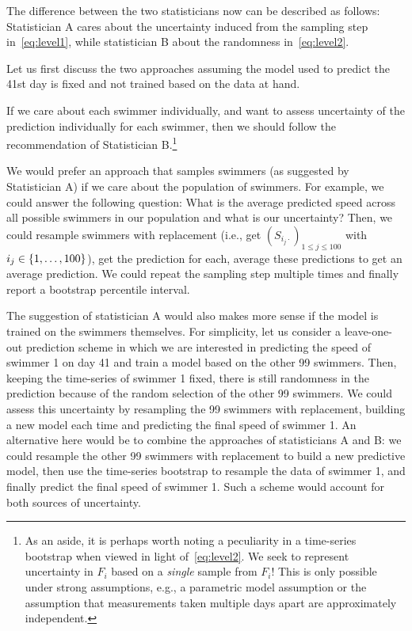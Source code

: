 The difference between the two statisticians now can be described as follows: Statistician A  cares about the uncertainty induced from the sampling step in~\eqref{eq:level1}, while statistician B about the randomness in~\eqref{eq:level2}. 

Let us first discuss the two approaches assuming the model used to predict the 41st day is fixed and not trained based on the data at hand.

If we care about each swimmer individually, and want to assess uncertainty of the prediction individually for each swimmer, then we should follow the recommendation of Statistician B.\footnote{As an aside, it is perhaps worth noting a peculiarity in a time-series bootstrap when viewed in light of~\eqref{eq:level2}. We seek to represent uncertainty in $F_i$ based on a \emph{single} sample from $F_i$! This is only possible under strong assumptions, e.g., a parametric model assumption or the assumption that measurements taken multiple days apart are approximately independent.}

We would prefer an approach that samples swimmers (as suggested by Statistician A) if we care about the population of swimmers. For example, we could answer the following question: What is the average predicted speed across all possible swimmers in our population and what is our uncertainty? Then, we could resample swimmers with replacement (i.e., get $(S_{i_j\cdot})_{1\leq j \leq 100}$ with $i_j \in \left\{1,\dotsc,100\right\}$), get the prediction for each, average these predictions to get an average prediction. We could repeat the sampling step multiple times and finally report a bootstrap percentile interval.

The suggestion of statistician A would also makes more sense if the model is trained on the swimmers themselves. For simplicity, let us consider a leave-one-out prediction scheme in which we are interested in predicting the speed of swimmer 1 on day 41 and train a model based on the other 99 swimmers. Then, keeping the time-series of swimmer 1 fixed, there is still randomness in the prediction because of the random selection of the other 99 swimmers. We could assess this uncertainty by resampling the 99 swimmers with replacement, building a new model each time and predicting the final speed of swimmer 1. An alternative here would be to combine the approaches of statisticians A and B: we could resample the other 99 swimmers with replacement to build a new predictive model, then use the time-series bootstrap to resample the data of swimmer 1, and finally predict the final speed of swimmer 1. Such a scheme would account for both sources of uncertainty. 








